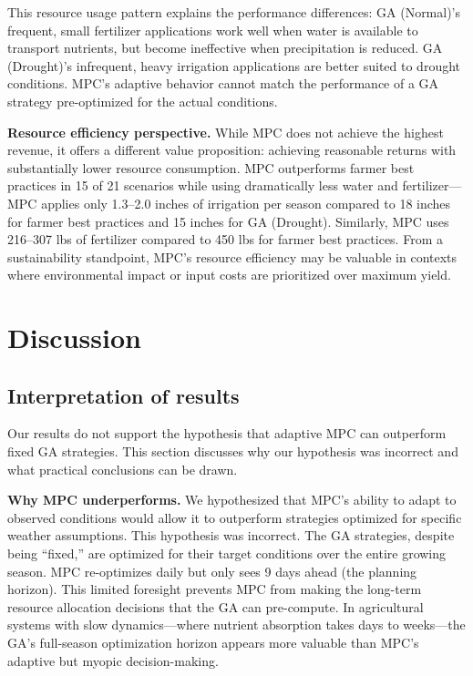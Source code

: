 \documentclass[preprint,12pt]{elsarticle}
\begin{document}
This resource usage pattern explains the performance differences: GA (Normal)'s frequent, small fertilizer applications work well when water is available to transport nutrients, but become ineffective when precipitation is reduced. GA (Drought)'s infrequent, heavy irrigation applications are better suited to drought conditions. MPC's adaptive behavior cannot match the performance of a GA strategy pre-optimized for the actual conditions.

\textbf{Resource efficiency perspective.} While MPC does not achieve the highest revenue, it offers a different value proposition: achieving reasonable returns with substantially lower resource consumption. MPC outperforms farmer best practices in 15 of 21 scenarios while using dramatically less water and fertilizer---MPC applies only 1.3--2.0 inches of irrigation per season compared to 18 inches for farmer best practices and 15 inches for GA (Drought). Similarly, MPC uses 216--307 lbs of fertilizer compared to 450 lbs for farmer best practices. From a sustainability standpoint, MPC's resource efficiency may be valuable in contexts where environmental impact or input costs are prioritized over maximum yield.

\section{Discussion}\label{sec:discussion}

\subsection{Interpretation of results}\label{subsec:interpretation}

Our results do not support the hypothesis that adaptive MPC can outperform fixed GA strategies. This section discusses why our hypothesis was incorrect and what practical conclusions can be drawn.

\textbf{Why MPC underperforms.} We hypothesized that MPC's ability to adapt to observed conditions would allow it to outperform strategies optimized for specific weather assumptions. This hypothesis was incorrect. The GA strategies, despite being ``fixed,'' are optimized for their target conditions over the entire growing season. MPC re-optimizes daily but only sees 9 days ahead (the planning horizon). This limited foresight prevents MPC from making the long-term resource allocation decisions that the GA can pre-compute. In agricultural systems with slow dynamics---where nutrient absorption takes days to weeks---the GA's full-season optimization horizon appears more valuable than MPC's adaptive but myopic decision-making.
\end{document}
